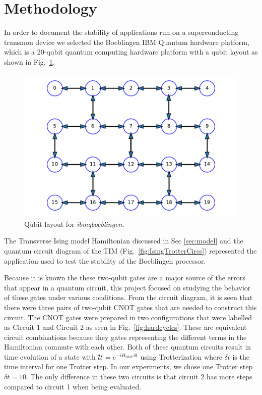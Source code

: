 
\section{Methodology}

In order to document the stability of applications run on a superconducting transmon device we selected the Boeblingen IBM Quantum hardware platform, which is a 20-qubit quantum computing hardware platform with a qubit layout as shown in Fig.~\ref{fig:Boeblingen_layout}. 
\begin{figure}[htpb]
    \centering
    \includegraphics[scale=0.4]{QubitsBoeblingen.pdf}
    \caption{Qubit layout for \emph{ibmq\textunderscore  boeblingen}.    }
    \label{fig:Boeblingen_layout}
\end{figure}

The Transverse Ising model Hamiltonian discussed in Sec \ref{sec:model} and the
quantum circuit diagram of the TIM (Fig.~\ref{fig:IsingTrotterCircs}) represented the application used to test the stability of the Boeblingen processor.  

Because it is known the these two-qubit gates are a major source of the errors that appear in a quantum circuit, this project focused on studying the behavior of these gates under various conditions.   From the circuit diagram, it is seen that there were three pairs of two-qubit CNOT gates that are needed to construct this circuit.  The CNOT gates were prepared in two configurations that were labelled as Circuit 1 and Circuit 2 as seen in Fig.~\ref{fig:hardcycles}.
These are equivalent circuit combinations because they gates representing the different terms in the Hamiltonian commute with each other. Both of these quantum circuits result in time evolution of a state with $\mathcal{U}=e^{-iH_{\text{OBC}}\delta t}$ using Trotterization where $\delta t$ is the time interval for one Trotter step. In our experiments, we chose one Trotter step $\delta t=10$. The only difference in these two circuits is that circuit 2 has more steps {\color{red}{KYA: I think ``deeper" is better than more steps}} compared to circuit 1 when being evaluated.   

